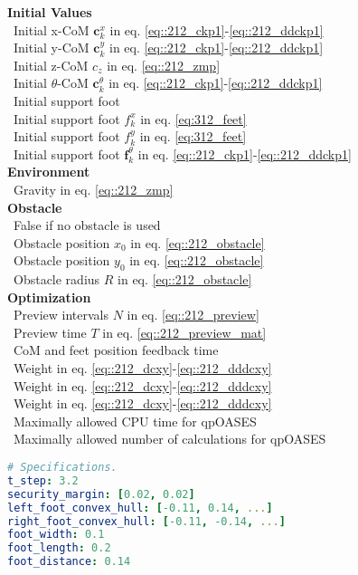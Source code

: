 \begin{minipage}[t]{1.\textwidth}
\begin{minipage}{0.5\textwidth}
{			\hfill \textbf{Initial Values}\\
			\mbox{}~\hfill Initial x-CoM $\bm{c}_k^x$ in eq. \ref{eq::212_ckp1}-\ref{eq::212_ddckp1}\\
			\mbox{}~\hfill Initial y-CoM $\bm{c}_k^y$ in eq. \ref{eq::212_ckp1}-\ref{eq::212_ddckp1}\\
			\mbox{}~\hfill Initial z-CoM $c_z$ in eq. \ref{eq::212_zmp}\\
			\mbox{}~\hfill Initial $\theta$-CoM $\bm{c}_k^\theta$ in eq. \ref{eq::212_ckp1}-\ref{eq::212_ddckp1}\\
			\mbox{}~\hfill Initial support foot\\
			\mbox{}~\hfill Initial support foot $f_k^x$ in eq. \ref{eq:312_feet}\\
			\mbox{}~\hfill Initial support foot $f_k^y$ in eq. \ref{eq:312_feet}\\
			\mbox{}~\hfill Initial support foot $\bm{f}_k^\theta$ in eq. \ref{eq::212_ckp1}-\ref{eq::212_ddckp1}\\
			
			\hfill \textbf{Environment}\\
			\mbox{}~\hfill Gravity in eq. \ref{eq::212_zmp}\\
			
			\hfill \textbf{Obstacle}\\
			\mbox{}~\hfill False if no obstacle is used\\
			\mbox{}~\hfill Obstacle position $x_0$ in eq. \ref{eq::212_obstacle}\\
			\mbox{}~\hfill Obstacle position $y_0$ in eq. \ref{eq::212_obstacle}\\
			\mbox{}~\hfill Obstacle radius $R$ in eq. \ref{eq::212_obstacle}\\
			
			\hfill \textbf{Optimization}\\
			\mbox{}~\hfill Preview intervals $N$ in eq. \ref{eq::212_preview}\\
			\mbox{}~\hfill Preview time $T$ in eq. \ref{eq::212_preview_mat}\\
			\mbox{}~\hfill CoM and feet position feedback time\\
			\mbox{}~\hfill Weight in eq. \ref{eq::212_dcxy}-\ref{eq::212_dddcxy}\\
			\mbox{}~\hfill Weight in eq. \ref{eq::212_dcxy}-\ref{eq::212_dddcxy}\\
			\mbox{}~\hfill Weight in eq. \ref{eq::212_dcxy}-\ref{eq::212_dddcxy}\\
			\mbox{}~\hfill Maximally allowed CPU time for qpOASES\\
			\mbox{}~\hfill Maximally allowed number of calculations for qpOASES}
	\end{minipage}
	\begin{minipage}{0.5\textwidth}
		\begin{lstlisting}[language=yaml]
# Specifications.
t_step: 3.2
security_margin: [0.02, 0.02]
left_foot_convex_hull: [-0.11, 0.14, ...]
right_foot_convex_hull: [-0.11, -0.14, ...]
foot_width: 0.1
foot_length: 0.2
foot_distance: 0.14


\end{lstlisting}
\end{minipage}
\end{minipage}
